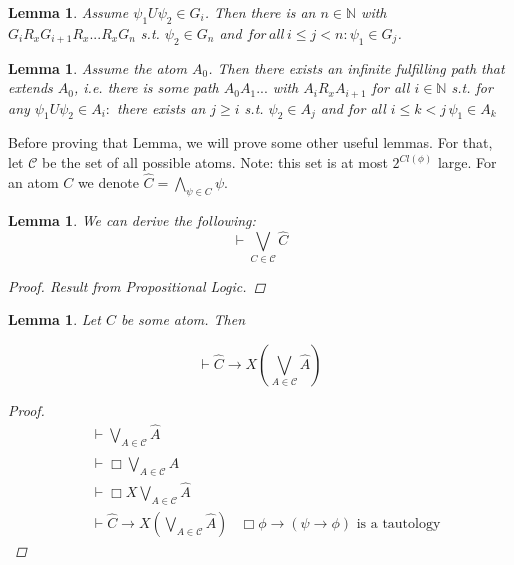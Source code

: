 \documentclass[11pt]{article}
\newtheorem{lemma}[theorem]{Lemma}
\theoremstyle{definition}
\theoremstyle{remark}
\begin{document}
\begin{lemma}
    Assume $\psi_1 U \psi_2 \in G_i$. Then there is an $n \in \mathbb{N}$ with $G_i R_x G_{i+1} R_x ...R_x G_n$ s.t.
    $\psi_2 \in G_n $ and $for \, all  \,i \leq j < n: \psi_1 \in G_j$.
\end{lemma}


\begin{lemma}
    Assume the atom $A_0$. Then there exists an infinite fulfilling path that extends $A_0$, i.e.
    there is some path $A_0A_1...$ with $A_i R_x A_{i+1}$ for all $i \in \mathbb{N}$ s.t.
    for any $\psi_1 U \psi_2 \in A_i: $ there exists an $j \geq i $ s.t. $\psi_2 \in A_j$ and for all $i \leq k < j \, \psi_1 \in A_k$ 
\end{lemma}

Before proving that Lemma, we will prove some other useful lemmas. For that, let $\mathcal{C}$ be the set of all possible atoms. Note: this set 
is at most $2^{Cl(\phi)}$ large. For an atom $C$ we denote $\hat{C} = \bigwedge_{\psi \in C} \psi$.

\begin{lemma}
    We can derive the following: 
    \[
        \vdash \bigvee_{C \in \mathcal{C}} \hat{C}
    \]


    \begin{proof}
        Result from Propositional Logic.
    \end{proof}

\end{lemma}

\begin{lemma}
    
    Let $C$ be some atom. Then

    \[
        \vdash \hat{C} \rightarrow X(\bigvee_{A \in \mathcal{C}} \hat{A})
    \]

    \begin{proof}
        
                \[
        \begin{array}{rll} 
                &  \vdash \bigvee_{A \in \mathcal{C}} \hat{A} \\
                &  \vdash \Box \bigvee_{A \in \mathcal{C}} \hat{A} \\
                &  \vdash \Box X \bigvee_{A \in \mathcal{C}} \hat{A} \\
                &  \vdash \hat{C} \rightarrow X (\bigvee_{A \in \mathcal{C}} \hat{A}) 
                &  \text{$\Box \phi \rightarrow (\psi \rightarrow \phi)$ is a tautology}


        \end{array}
                \]

    \end{proof}

\end{lemma}
\end{document}

